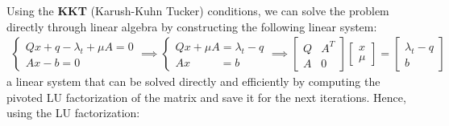 \documentclass[notitlepage]{article}
\begin{document}
Using the {\bf KKT} (Karush-Kuhn Tucker) conditions, we can solve the problem directly through linear algebra by constructing the following linear system:
\begin{gather*}
  \begin{cases}
    Q x + q - \lambda_t + \mu A = 0 \\
    A x - b = 0
  \end{cases}
  \implies 
  \begin{cases}
    Q x + \mu A = \lambda_t - q \\
    A x \quad \quad \:\ \,= b 
  \end{cases}
  \boldsymbol{\implies} 
  \begin{bmatrix}
    Q & A^T \\[1ex]
    A & 0 
  \end{bmatrix}
  \begin{bmatrix}
    x \\[1ex]
    \mu
  \end{bmatrix}
  = 
  \begin{bmatrix}
    \lambda_t - q \\[1ex]
    b
  \end{bmatrix}
\end{gather*}
a linear system that can be solved directly and efficiently by computing the pivoted LU factorization of the matrix and save it for the next iterations. Hence, using the LU factorization:
\end{document}
